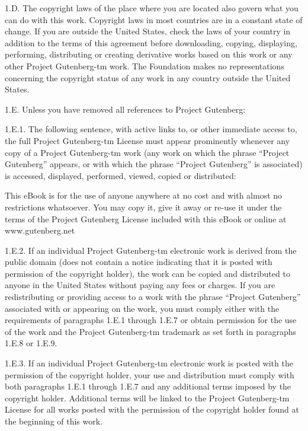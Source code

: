 \documentclass[12pt,oneside]{scrbook}
\begin{document}
  1.D. The copyright laws of the place where you are located also govern
  what you can do with this work. Copyright laws in most countries are in
  a constant state of change. If you are outside the United States, check
  the laws of your country in addition to the terms of this agreement
  before downloading, copying, displaying, performing, distributing or
  creating derivative works based on this work or any other Project
  Gutenberg-tm work. The Foundation makes no representations concerning
  the copyright status of any work in any country outside the United
  States.
  
  1.E. Unless you have removed all references to Project Gutenberg:
  
  1.E.1. The following sentence, with active links to, or other immediate
  access to, the full Project Gutenberg-tm License must appear prominently
  whenever any copy of a Project Gutenberg-tm work (any work on which the
  phrase ``Project Gutenberg'' appears, or with which the phrase ``Project
  Gutenberg'' is associated) is accessed, displayed, performed, viewed,
  copied or distributed:
  
  This eBook is for the use of anyone anywhere at no cost and with almost
  no restrictions whatsoever. You may copy it, give it away or re-use it
  under the terms of the Project Gutenberg License included with this
  eBook or online at www.gutenberg.net
  
  1.E.2. If an individual Project Gutenberg-tm electronic work is derived
  from the public domain (does not contain a notice indicating that it is
  posted with permission of the copyright holder), the work can be copied
  and distributed to anyone in the United States without paying any fees
  or charges. If you are redistributing or providing access to a work with
  the phrase ``Project Gutenberg'' associated with or appearing on the
  work, you must comply either with the requirements of paragraphs 1.E.1
  through 1.E.7 or obtain permission for the use of the work and the
  Project Gutenberg-tm trademark as set forth in paragraphs 1.E.8 or
  1.E.9.
  
  1.E.3. If an individual Project Gutenberg-tm electronic work is posted
  with the permission of the copyright holder, your use and distribution
  must comply with both paragraphs 1.E.1 through 1.E.7 and any additional
  terms imposed by the copyright holder. Additional terms will be linked
  to the Project Gutenberg-tm License for all works posted with the
  permission of the copyright holder found at the beginning of this work.
  
\end{document}
